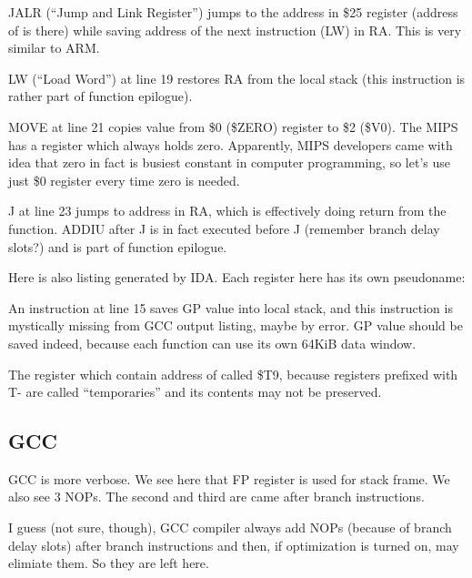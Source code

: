 JALR (``Jump and Link Register'') jumps to the address in \$25 register (address of \puts is there) while saving
address of the next instruction (LW) in \ac{RA}.
This is very similar to ARM.

LW (``Load Word'') at line 19 restores \ac{RA} from the local stack 
(this instruction is rather part of function epilogue).

MOVE at line 21 copies value from \$0 (\$ZERO) register to \$2 (\$V0). The MIPS has a  register which
always holds zero.
Apparently, MIPS developers came with idea that zero in fact is busiest constant in computer programming,
so let's use just \$0 register every time zero is needed.

J at line 23 jumps to address in \ac{RA}, which is effectively doing return from the function.
ADDIU after J is in fact executed before J (remember branch delay slots?) and is part of function epilogue.

Here is also listing generated by IDA. Each register here has its own pseudoname:



An instruction at line 15 saves GP value into local stack, and this instruction is mystically missing
from GCC output listing, maybe by error.
GP value should be saved indeed, because each function can use its own 64KiB data window.

The register which contain address of \puts called \$T9, because registers prefixed with T- are called
``temporaries'' and its contents may not be preserved.

\subsection{\NonOptimizing GCC}



\NonOptimizing GCC is more verbose.
We see here that FP register is used for stack frame.
We also see 3 \ac{NOP}s.
The second and third are came after branch instructions.

I guess (not sure, though), GCC compiler always add \ac{NOP}s (because of branch delay slots) after branch
instructions and then, if optimization is turned on, may elimiate them.
So they are left here.

